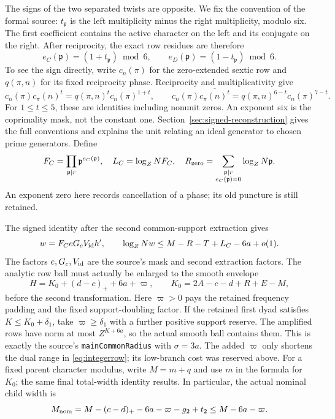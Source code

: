 \documentclass[11pt]{article}
\theoremstyle{definition}
\newcommand{\code}[1]{\texttt{\small #1}}
\begin{document}
The signs of the two separated twists are opposite. We fix the convention
of the formal source: $t_{\mathfrak p}$ is the left multiplicity minus
the right multiplicity, modulo six. The first coefficient contains the
active character on the left and its conjugate on the right. After
reciprocity, the exact row residues are therefore
\[
 e_C(\mathfrak p)=(1+t_{\mathfrak p})\bmod6,\qquad
 e_D(\mathfrak p)=(1-t_{\mathfrak p})\bmod6.
\]
To see the sign directly, write $c_n(\pi)$ for the zero-extended sextic
row and $q(\pi,n)$ for its fixed reciprocity phase. Reciprocity and
multiplicativity give
\[
 c_n(\pi)c_\pi(n)^t=q(\pi,n)^t c_n(\pi)^{1+t},\qquad
 c_n(\pi)\overline{c_\pi(n)^t}
   =q(\pi,n)^{6-t}c_n(\pi)^{7-t}.
\]
For $1\le t\le5$, these are identities including nonunit zeros.
An exponent six is the coprimality mask, not the constant one.
Section~\ref{sec:signed-reconstruction} gives the full conventions and
explains the unit relating an ideal generator to chosen prime generators.
Define
\[
 F_C=\prod_{\mathfrak p\mid r}\mathfrak p^{e_C(\mathfrak p)},\quad
 L_C=\log_Z NF_C,\quad
 R_{\rm zero}=\sum_{\substack{\mathfrak p\mid r\\e_C(\mathfrak p)=0}}
                       \log_Z N\mathfrak p.
\]
An exponent zero here records cancellation of a phase; its old puncture
is still retained.

The signed identity after the second common-support extraction gives
\begin{equation}\label{eq:integerrow}
 w=F_CeG_cV_{\rm id}h',\qquad
 \log_Z Nw\le M-R-T+L_C-6a+o(1).
\end{equation}
The factors $e,G_c,V_{\rm id}$ are the source's mask and second
extraction factors. The analytic row ball must actually be enlarged to
the smooth envelope
\begin{equation}\label{eq:envelope}
 H=K_0+(d-c)_++6a+\varpi,\qquad K_0=2A-c-d+R+E-M,
\end{equation}
before the second transformation. Here $\varpi>0$ pays the retained
frequency padding and the fixed support-doubling factor. If the retained
first dyad satisfies $K\le K_0+\delta_1$, take
$\varpi\ge\delta_1$ with a further positive support reserve. The amplified
rows have norm at most $Z^{K+6a}$, so the actual smooth ball contains them.
This is exactly the source's \code{mainCommonRadius} with $\sigma=3a$.
The added $\varpi$ only shortens the dual range in
\eqref{eq:integerrow}; its low-branch cost was reserved above.
For a fixed parent character modulus, write $M=m+q$ and use $m$ in the
formula for $K_0$; the same final total-width identity results.
In particular, the actual nominal child width is
\[
 M_{\rm nom}=M-(c-d)_+-6a-\varpi-g_2+t_2\le M-6a-\varpi.
\]
\end{document}
